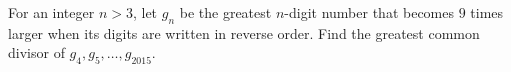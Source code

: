 For an integer $n>3$, let $g_n$ be the greatest $n$-digit number that becomes $9$ times larger when its digits are written in reverse order. Find the greatest common divisor of $g_4,g_5,\dots,g_{2015}$.
